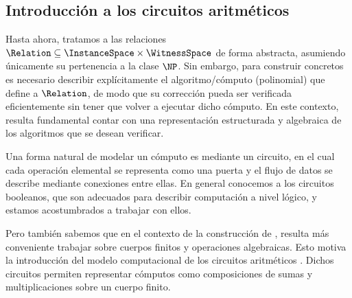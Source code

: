 
\subsection{Introducción a los circuitos aritméticos}

Hasta ahora, tratamos a las relaciones $\Relation \subseteq \InstanceSpace \times \WitnessSpace$ de forma abstracta, asumiendo únicamente su pertenencia a la clase $\NP$. Sin embargo, para construir \SNARK concretos es necesario describir explícitamente el algoritmo/cómputo (polinomial) que define a $\Relation$, de modo que su corrección pueda ser verificada eficientemente sin tener que volver a ejecutar dicho cómputo. En este contexto, resulta fundamental contar con una representación estructurada y algebraica de los algoritmos que se desean verificar.

Una forma natural de modelar un cómputo es mediante un circuito, en el cual cada operación elemental se representa como una puerta y el flujo de datos se describe mediante conexiones entre ellas. En general conocemos a los circuitos booleanos, que son adecuados para describir computación a nivel lógico, y estamos acostumbrados a trabajar con ellos.

Pero también sabemos que en el contexto de la construcción de \SNARK, resulta más conveniente trabajar sobre cuerpos finitos y operaciones algebraicas. Esto motiva la introducción del modelo computacional de los circuitos aritméticos \cite{DBLP:journals/ftsec/Thaler22}. Dichos circuitos permiten representar cómputos como composiciones de sumas y multiplicaciones sobre un cuerpo finito.

